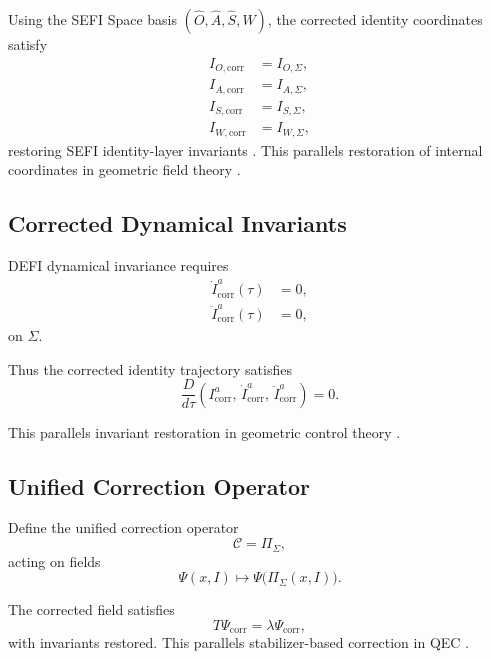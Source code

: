 \documentclass[aip,jmp,reprint,onecolumn,nofootinbib]{revtex4-2}
\begin{document}
Using the SEFI Space basis $(\hat{O},\hat{A},\hat{S},\hat{W})$, the corrected identity 
coordinates satisfy
\begin{align}
I_{O,\mathrm{corr}} &= I_{O,\Sigma}, \\
I_{A,\mathrm{corr}} &= I_{A,\Sigma}, \\
I_{S,\mathrm{corr}} &= I_{S,\Sigma}, \\
I_{W,\mathrm{corr}} &= I_{W,\Sigma},
\end{align}
restoring SEFI identity-layer invariants \cite{DuttonSEFI2026,DuttonSEFISpace2026}. This 
parallels restoration of internal coordinates in geometric field theory \cite{Nakahara,Frankel}.

\subsection{Corrected Dynamical Invariants}

DEFI dynamical invariance \cite{DuttonDEFI2026} requires
\begin{align}
\dot{I}_{\mathrm{corr}}^a(\tau) &= 0, \\
\ddot{I}_{\mathrm{corr}}^a(\tau) &= 0,
\end{align}
on $\Sigma$.

Thus the corrected identity trajectory satisfies
\begin{equation}
\frac{D}{d\tau}
\left(
I_{\mathrm{corr}}^a,\,
\dot{I}_{\mathrm{corr}}^a,\,
\ddot{I}_{\mathrm{corr}}^a
\right)
= 0.
\end{equation}

This parallels invariant restoration in geometric control theory \cite{MarsdenWest}.

\subsection{Unified Correction Operator}

Define the unified correction operator
\begin{equation}
\mathcal{C} = \Pi_\Sigma,
\end{equation}
acting on fields
\begin{equation}
\Psi(x,I) \mapsto \Psi\big(\Pi_\Sigma(x,I)\big).
\end{equation}

The corrected field satisfies
\begin{equation}
T \Psi_{\mathrm{corr}} = \lambda \Psi_{\mathrm{corr}},
\end{equation}
with invariants restored. This parallels stabilizer-based correction in QEC 
\cite{GottesmanQEC,PreskillQEC}.
\end{document}
